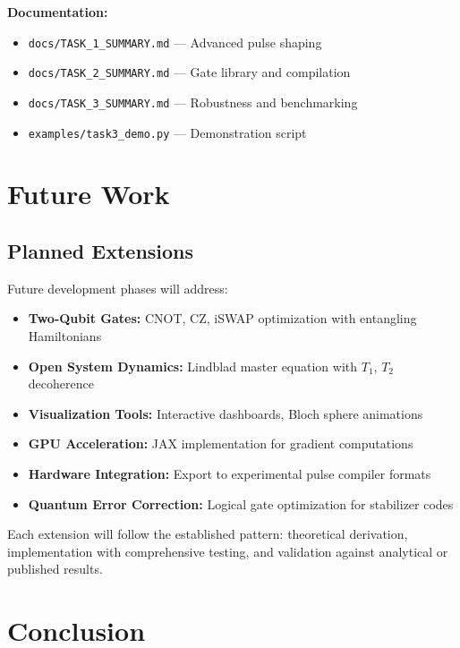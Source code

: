 \documentclass[11pt,a4paper]{article}
\theoremstyle{definition}
\theoremstyle{remark}
\begin{document}
\textbf{Documentation:}
\begin{itemize}
    \item \texttt{docs/TASK\_1\_SUMMARY.md} — Advanced pulse shaping
    \item \texttt{docs/TASK\_2\_SUMMARY.md} — Gate library and compilation
    \item \texttt{docs/TASK\_3\_SUMMARY.md} — Robustness and benchmarking
    \item \texttt{examples/task3\_demo.py} — Demonstration script
\end{itemize}

\section{Future Work}

\subsection{Planned Extensions}

Future development phases will address:

\begin{itemize}
    \item \textbf{Two-Qubit Gates:} CNOT, CZ, iSWAP optimization with entangling Hamiltonians
    \item \textbf{Open System Dynamics:} Lindblad master equation with $T_1$, $T_2$ decoherence
    \item \textbf{Visualization Tools:} Interactive dashboards, Bloch sphere animations
    \item \textbf{GPU Acceleration:} JAX implementation for gradient computations
    \item \textbf{Hardware Integration:} Export to experimental pulse compiler formats
    \item \textbf{Quantum Error Correction:} Logical gate optimization for stabilizer codes
\end{itemize}

Each extension will follow the established pattern: theoretical derivation, implementation with comprehensive testing, and validation against analytical or published results.

\section{Conclusion}
\end{document}
